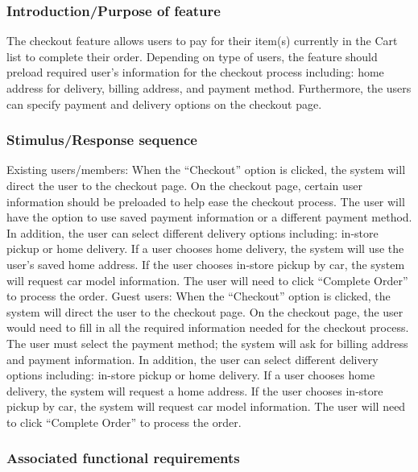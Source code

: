 \documentclass{scrreprt}
\theoremstyle{funreq}
\begin{document}
	\subsubsection{Introduction/Purpose of feature}
	The checkout feature allows users to pay for their item(s) currently in the Cart list to complete their order. Depending on type of users, the feature should preload required user’s information for the checkout process including: home address for delivery, billing address, and payment method. Furthermore, the users can specify payment and delivery options on the checkout page. 
	
	\subsubsection{Stimulus/Response sequence}
	Existing users/members:
	When the “Checkout” option is clicked, the system will direct the user to the checkout page. On the checkout page, certain user information should be preloaded to help ease the checkout process. The user will have the option to use saved payment information or a different payment method. In addition, the user can select different delivery options including: in-store pickup or home delivery. If a user chooses home delivery, the system will use the user's saved home address. If the user chooses in-store pickup by car, the system will request car model information. The user will need to click “Complete Order” to process the order.
	Guest users: 
	When the “Checkout” option is clicked, the system will direct the user to the checkout page. On the checkout page, the user would need to fill in all the required information needed for the checkout process. The user must select the payment method; the system will ask for billing address and payment information. In addition, the user can select different delivery options including: in-store pickup or home delivery. If a user chooses home delivery, the system will request a home address. If the user chooses in-store pickup by car, the system will request car model information. The user will need to click “Complete Order” to process the order.
	
	
	\subsubsection{Associated functional requirements}
	
\end{document}
